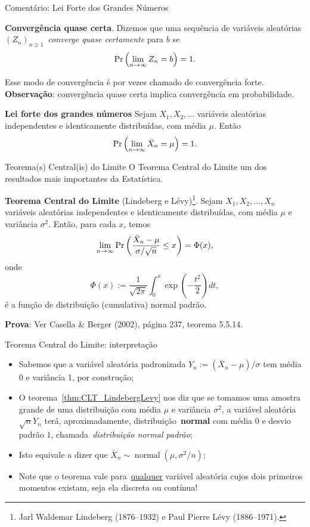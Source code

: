 \begin{frame}{Comentário: Lei Forte dos Grandes Números}
\begin{defn}
 \label{dfn:as_convergence}
 \textbf{Convergência quase certa}.
Dizemos que uma sequência de variáveis aleatórias $\left(Z_n\right)_{n\geq 1}$~\textit{converge quase certamente} para $b$ se
$$\operatorname{Pr}\left(\lim_{n\to \infty} Z_n = b\right) = 1.$$
\end{defn}
Esse modo de convergência é por vezes chamado de convergência forte.
\textbf{Observação}: convergência quase certa implica convergência em probabilidade.
 \begin{theo}
  \label{thm:SLLN}
  \textbf{Lei forte dos grandes números}
 Sejam  $X_1, X_2, \ldots$ variáveis aleatórias independentes e identicamente distribuídas, com média $\mu$.
 Então
 $$\operatorname{Pr}\left(\lim_{n\to \infty} \bar{X}_n = \mu \right) = 1.$$
 \end{theo}
\end{frame}
\begin{frame}[fragile]{Teorema(s) Central(is) do Limite}
O Teorema Central do Limite um dos resultados mais importantes da Estatística.
\begin{theo}
 \label{thm:CLT_LindebergLevy}
\textbf{Teorema Central do Limite} (Lindeberg e Lévy)\footnote{Jarl Waldemar Lindeberg (1876--1932) e Paul Pierre Lévy (1886--1971).}.
Sejam  $X_1, X_2, \ldots, X_n$ variáveis aleatórias independentes e identicamente distribuídas, com média $\mu$ e variância $\sigma^2$.
Então, para cada $x$, temos
$$ \lim_{n\to\infty} \operatorname{Pr}\left( \frac{\bar{X}_n - \mu}{\sigma/\sqrt{n}} \leq x \right) = \Phi(x), $$
onde 
$$\Phi(x) := \frac{1}{\sqrt{2\pi}}\int_0^x \exp\left(-\frac{t^2}{2}\right)dt,$$
é a função de distribuição (cumulativa) normal padrão.
\end{theo}
\textbf{Prova}: Ver Casella \& Berger (2002), página 237, teorema 5.5.14.
% 
\end{frame}
\begin{frame}{Teorema Central do Limite: interpretação}
\begin{itemize}
 \item Sabemos que a variável aleatória padronizada $Y_n := \left(\bar{X}_n - \mu\right)/\sigma$ tem média 0 e variância 1, por construção;
 \item O teorema~\ref{thm:CLT_LindebergLevy} nos diz que se tomamos uma amostra grande de uma distribuição com média $\mu$ e variância $\sigma^2$, a variável aleatória $\sqrt{n}Y_n$ terá, aproximadamente, distribuição~\textbf{normal} com média 0 e desvio padrão $1$, chamada~\textit{distribuição normal padrão};
 \item Isto equivale a dizer que $\bar{X}_n \sim \operatorname{normal}(\mu, \sigma^2/n)$;
 \item Note que o teorema vale para~\underline{qualquer} variável aleatória cujos dois primeiros momentos existam, seja ela discreta ou contínua!
\end{itemize}
\end{frame}
